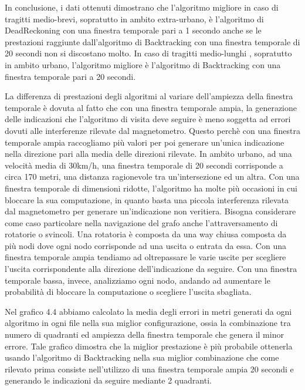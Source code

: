 \documentclass[12pt,a4paper,openright,twoside]{report}
\begin{document}
\medskip
In conclusione, i dati ottenuti dimostrano che l'algoritmo migliore in caso di tragitti medio-brevi, sopratutto in ambito extra-urbano, è l'algoritmo di DeadReckoning con una finestra temporale pari a 1 secondo anche se le prestazioni raggiunte dall'algoritmo di Backtracking con una finestra temporale di 20 secondi non si discostano molto. 
In caso di tragitti medio-lunghi , sopratutto in ambito urbano, l'algoritmo migliore è l'algoritmo di Backtracking con una finestra temporale pari a 20 secondi.

La differenza di prestazioni degli algoritmi al variare dell'ampiezza della finestra temporale è dovuta al fatto che con una finestra temporale ampia, la generazione delle indicazioni che l'algoritmo di visita deve seguire è meno soggetta ad errori dovuti alle interferenze rilevate dal magnetometro. Questo perchè con una finestra temporale ampia raccogliamo più valori per poi generare un'unica indicazione nella direzione pari alla media delle direzioni rilevate. In ambito urbano, ad una velocità media di 30km/h, una finestra temporale di 20 secondi corrisponde a circa 170 metri, una distanza ragionevole tra un'intersezione ed un altra. Con una finestra temporale di dimensioni ridotte, l'algoritmo ha molte più occasioni in cui bloccare la sua computazione, in quanto basta una piccola interferenza rilevata dal magnetometro per generare un'indicazione non veritiera.
Bisogna considerare come caso particolare nella navigazione del grafo anche l'attraversamento di rotatorie o svincoli. Una rotatoria è composta da una way chiusa composta da più nodi dove ogni nodo corrisponde ad una uscita o entrata da essa. Con una finestra temporale ampia tendiamo ad oltrepassare le varie uscite per scegliere l'uscita corrispondente alla direzione dell'indicazione da seguire. Con una finestra temporale bassa, invece, analizziamo ogni nodo, andando ad aumentare le probabilità di bloccare la computazione o scegliere l'uscita sbagliata.

Nel grafico 4.4 abbiamo calcolato la media degli errori in metri generati da ogni algoritmo in ogni file nella sua miglior configurazione, ossia la combinazione tra numero di quadranti ed ampiezza della finestra temporale che genera il minor errore. Tale grafico dimostra che la miglior prestazione è più probabile ottenerla usando l'algoritmo di Backtracking nella sua miglior combinazione che come rilevato prima consiste nell'utilizzo di una finestra temporale ampia 20 secondi e generando le indicazioni da seguire mediante 2 quadranti.
\end{document}
